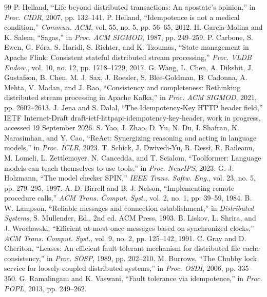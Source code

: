 \documentclass[conference,10pt]{IEEEtran}
\begin{document}
\begin{thebibliography}{99}
 P. Helland, ``Life beyond distributed transactions: An apostate's opinion,'' in \emph{Proc. CIDR}, 2007, pp. 132--141.
 P. Helland, ``Idempotence is not a medical condition,'' \emph{Commun. ACM}, vol. 55, no. 5, pp. 56--65, 2012.
 H. Garcia-Molina and K. Salem, ``Sagas,'' in \emph{Proc. ACM SIGMOD}, 1987, pp. 249--259.
 P. Carbone, S. Ewen, G. F\'{o}ra, S. Haridi, S. Richter, and K. Tzoumas, ``State management in Apache Flink: Consistent stateful distributed stream processing,'' \emph{Proc. VLDB Endow.}, vol. 10, no. 12, pp. 1718--1729, 2017.
 G. Wang, L. Chen, A. Dikshit, J. Gustafson, B. Chen, M. J. Sax, J. Roesler, S. Blee-Goldman, B. Cadonna, A. Mehta, V. Madan, and J. Rao, ``Consistency and completeness: Rethinking distributed stream processing in Apache Kafka,'' in \emph{Proc. ACM SIGMOD}, 2021, pp. 2602--2613.
 J. Jena and S. Dalal, ``The Idempotency-Key HTTP header field,'' IETF Internet-Draft draft-ietf-httpapi-idempotency-key-header, work in progress, accessed 19 September 2026.
 S. Yao, J. Zhao, D. Yu, N. Du, I. Shafran, K. Narasimhan, and Y. Cao, ``ReAct: Synergizing reasoning and acting in language models,'' in \emph{Proc. ICLR}, 2023.
 T. Schick, J. Dwivedi-Yu, R. Dess\`{i}, R. Raileanu, M. Lomeli, L. Zettlemoyer, N. Cancedda, and T. Scialom, ``Toolformer: Language models can teach themselves to use tools,'' in \emph{Proc. NeurIPS}, 2023.
 G. J. Holzmann, ``The model checker SPIN,'' \emph{IEEE Trans. Softw. Eng.}, vol. 23, no. 5, pp. 279--295, 1997.
 A. D. Birrell and B. J. Nelson, ``Implementing remote procedure calls,'' \emph{ACM Trans. Comput. Syst.}, vol. 2, no. 1, pp. 39--59, 1984.
 B. W. Lampson, ``Reliable messages and connection establishment,'' in \emph{Distributed Systems}, S. Mullender, Ed., 2nd ed. ACM Press, 1993.
 B. Liskov, L. Shrira, and J. Wroclawski, ``Efficient at-most-once messages based on synchronized clocks,'' \emph{ACM Trans. Comput. Syst.}, vol. 9, no. 2, pp. 125--142, 1991.
 C. Gray and D. Cheriton, ``Leases: An efficient fault-tolerant mechanism for distributed file cache consistency,'' in \emph{Proc. SOSP}, 1989, pp. 202--210.
 M. Burrows, ``The Chubby lock service for loosely-coupled distributed systems,'' in \emph{Proc. OSDI}, 2006, pp. 335--350.
 G. Ramalingam and K. Vaswani, ``Fault tolerance via idempotence,'' in \emph{Proc. POPL}, 2013, pp. 249--262.

\end{thebibliography}
\end{document}
